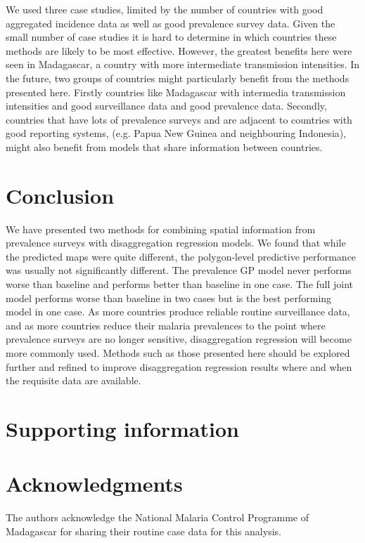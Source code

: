 \documentclass{statsoc}
\begin{document}
We used three case studies, limited by the number of countries with good aggregated incidence data as well as good prevalence survey data.
Given the small number of case studies it is hard to determine in which countries these methods are likely to be most effective.
However, the greatest benefits here were seen in Madagascar, a country with more intermediate transmission intensities.
In the future, two groups of countries might particularly benefit from the methods presented here.
Firstly countries like Madagascar with intermedia transmission intensities and good surveillance data and good prevalence data.
Secondly, countries that have lots of prevalence surveys and are adjacent to countries with good reporting systems, (e.g. Papua New Guinea and neighbouring Indonesia), might also benefit from models that share information between countries.


\section*{Conclusion}


We have presented two methods for combining spatial information from prevalence surveys with disaggregation regression models.
We found that while the predicted maps were quite different, the polygon-level predictive performance was usually not significantly different.
The prevalence GP model never performs worse than baseline and performs better than baseline in one case. 
The full joint model performs worse than baseline in two cases but is the best performing model in one case.
As more countries produce reliable routine surveillance data, and as more countries reduce their malaria prevalences to the point where prevalence surveys are no longer sensitive, disaggregation regression will become more commonly used. 
Methods such as those presented here should be explored further and refined to improve disaggregation regression results where and when the requisite data are available.



\section*{Supporting information}


\section*{Acknowledgments}
The authors acknowledge the National Malaria Control Programme of Madagascar for sharing their routine case data for this analysis.






 
\end{document}
